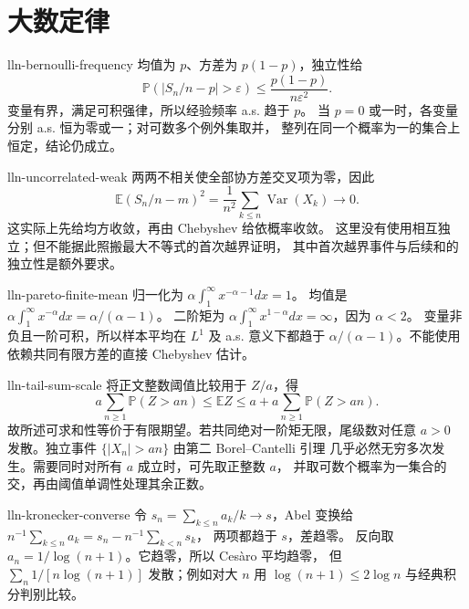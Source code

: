 \chapter{大数定律}

\begin{solution}{lln-bernoulli-frequency}
均值为 $p$、方差为 $p(1-p)$，独立性给
\[
 \mathbb P(|S_n/n-p|>\varepsilon)
 \le\frac{p(1-p)}{n\varepsilon^2}.
\]
变量有界，满足可积强律，所以经验频率 a.s. 趋于 $p$。
当 $p=0$ 或一时，各变量分别 a.s. 恒为零或一；对可数多个例外集取并，
整列在同一个概率为一的集合上恒定，结论仍成立。
\end{solution}

\begin{solution}{lln-uncorrelated-weak}
两两不相关使全部协方差交叉项为零，因此
\[
 \mathbb E(S_n/n-m)^2
 =\frac1{n^2}\sum_{k\le n}\operatorname{Var}(X_k)\longrightarrow0.
\]
这实际上先给均方收敛，再由 Chebyshev 给依概率收敛。
这里没有使用相互独立；但不能据此照搬最大不等式的首次越界证明，
其中首次越界事件与后续和的独立性是额外要求。
\end{solution}

\begin{solution}{lln-pareto-finite-mean}
归一化为 $\alpha\int_1^\infty x^{-\alpha-1}dx=1$。
均值是 $\alpha\int_1^\infty x^{-\alpha}dx=\alpha/(\alpha-1)$。
二阶矩为 $\alpha\int_1^\infty x^{1-\alpha}dx=\infty$，因为 $\alpha<2$。
变量非负且一阶可积，所以样本平均在 $L^1$ 及 a.s. 意义下都趋于
$\alpha/(\alpha-1)$。不能使用依赖共同有限方差的直接 Chebyshev 估计。
\end{solution}

\begin{solution}{lln-tail-sum-scale}
将正文整数阈值比较用于 $Z/a$，得
\[
 a\sum_{n\ge1}\mathbb P(Z>an)\le\mathbb EZ
 \le a+a\sum_{n\ge1}\mathbb P(Z>an).
\]
故所述可求和性等价于有限期望。若共同绝对一阶矩无限，尾级数对任意
$a>0$ 发散。独立事件 $\{|X_n|>an\}$ 由第二 Borel--Cantelli 引理
几乎必然无穷多次发生。需要同时对所有 $a$ 成立时，可先取正整数 $a$，
并取可数个概率为一集合的交，再由阈值单调性处理其余正数。
\end{solution}

\begin{solution}{lln-kronecker-converse}
令 $s_n=\sum_{k\le n}a_k/k\to s$，Abel 变换给
$n^{-1}\sum_{k\le n}a_k=s_n-n^{-1}\sum_{k<n}s_k$，
两项都趋于 $s$，差趋零。
反向取 $a_n=1/\log(n+1)$。它趋零，所以 Cesàro 平均趋零，
但 $\sum_n1/[n\log(n+1)]$ 发散；例如对大 $n$ 用
$\log(n+1)\le2\log n$ 与经典积分判别比较。
\end{solution}

